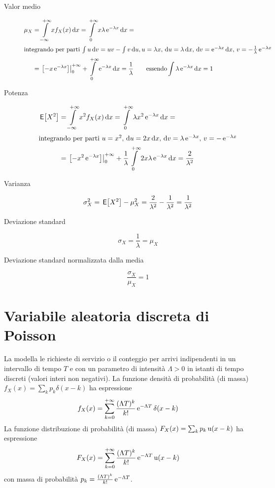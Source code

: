 \begin{description}
\item[Valor medio]
\begin{equation}\begin{split}\mu_X&=\intinf{x f_X(x)}{x}=\intd{0}{+\infty}{x \lambda\e{-\lambda x}}{x}=\\
\intertext{integrando per parti $\int{u \diff v}=u v-\int{v\diff u}, u=\lambda x$, $\diff u=\lambda\diff x$, $\diff v=\e{-\lambda x}\diff x$, $v=-\frac{1}{\lambda}\e{-\lambda x}$}
&=\bound{0}{+\infty}{-x\e{-\lambda x}}+\intd{0}{+\infty}{\e{-\lambda x}}{x}=\frac{1}{\lambda} 	\qquad\text{essendo} \int\lambda\e{-\lambda x}\diff x=1\end{split}\end{equation}
\item[Potenza]
\begin{equation}\begin{split}
\E{X^2}&=\intinf{x^2 f_X(x)}{x}=\intd{0}{+\infty}{\lambda x^2\e{-\lambda x}}{x}=\\
\intertext{integrando per parti $u=x^2$, $\diff u=2x\diff x$, $\diff v=\lambda\e{-\lambda x}$, $v=-\e{-\lambda x}$}
&=\bound{0}{+\infty}{-x^2\e{-\lambda x}}+\frac{1}{\lambda}\intd{0}{+\infty}{2x \lambda\e{-\lambda x}}{x}=\frac{2}{\lambda^2}
\end{split}\end{equation}
\item[Varianza]
\[\sigma^2_X=\E{X^2}-\mu^2_X=\frac{2}{\lambda^2}-\frac{1}{\lambda^2}=\frac{1}{\lambda^2}\]
\item[Deviazione standard]
\[\sigma_X=\frac{1}{\lambda}=\mu_X\]
\item[Deviazione standard normalizzata dalla media] \[\frac{\sigma_X}{\mu_X}=1\]
\end{description}

\section{Variabile aleatoria discreta di Poisson}
La  modella le richieste di servizio o il conteggio per arrivi indipendenti in un intervallo di tempo $T$ e con un parametro di intensità $\Lambda>0$ in istanti di tempo discreti (valori interi non negativi). La funzione densità di probabilità (di massa) $f_X(x)=\sum_k p_k \delta(x-k)$ ha espressione
\begin{equation}
f_X(x)=\sum_{k=0}^{+\infty}{\frac{(\Lambda T)^k}{k!}\e{-\Lambda T}\delta(x-k)}
\end{equation}
La funzione distribuzione di probabilità (di massa) $F_X(x)=\sum_k p_k \step(x-k)$ ha espressione
\begin{equation}
F_X(x)=\sum_{k=0}^{+\infty}{\frac{(\Lambda T)^k}{k!}\e{-\Lambda T}\step(x-k)}
\end{equation}
con massa di probabilità $p_k=\frac{(\Lambda T)^k}{k!}\e{-\Lambda T}$.

